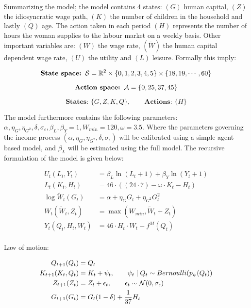 Summarizing the model; the model contains 4 states: $(G)$ human capital, $(Z)$ the idiosyncratic wage path, $(K)$ the number of children in the household and lastly $(Q)$ age. The action taken in each period $(H)$ represents the number of hours the woman supplies to the labour market on a weekly basis. Other important variables are: $(W)$ the wage rate, $(\tilde{W})$ the human capital dependent wage rate,  $(U)$ the utility and $(L)$ leisure. Formally this imply:

\begin{equation}
    \textbf{State space: }\mathcal{S} = \mathbb{R}^{2} \times \{0, 1, 2, 3, 4, 5\} \times \{ 18, 19, \cdots, 60\}
\end{equation}

\begin{equation}
    \textbf{Action space: }\mathcal{A}  = \{0, 25, 37, 45\} 
\end{equation}

\begin{equation}
    \textbf{States: }\{G, Z, K, Q\}, \qquad \textbf{Actions: } \{H\} 
\end{equation}

The model furthermore contains the following parameters: $\alpha, \eta_G, \eta_{G^2}, \delta, \sigma_\epsilon, \beta_L, \beta_Y=1, W_{min}=120, \omega=3.5$. Where the parameters governing the income process $(\alpha, \eta_G, \eta_{G^2}, \delta, \sigma_\epsilon)$ will be calibrated using a simple agent based model, and $\beta_L$ will be estimated using the full model. The recursive formulation of the model is given below:

\begin{align}
    U_t(L_t, Y_t) &= \beta_L \ln(L_t + 1) + \beta_Y \ln(Y_t + 1) \label{eq:utility_v1}\\
    L_t(K_t, H_t) &= 46 \cdot ((24 \cdot 7) - \omega \cdot K_t  - H_t) \label{eq:leissure_v1}\\
    \log \tilde{W}_t (G_t) &= \alpha + \eta_G G_t + \eta_{G^2} G_t^2 \label{eq:salary_tilde_v1}\\
    W_t(\tilde{W}_t, Z_t) &= \max(W_{min} , \tilde{W}_t  + Z_t)  \label{eq:salary_v1}\\
    Y_t(Q_t,H_t, W_t) &= 46 \cdot H_t \cdot W_t + f^M(Q_t) \label{eq:total_salary_v1}\\
\end{align}

Law of motion:

\begin{align}
    Q_{t+1}(Q_t) &= Q_t \label{eq:age_v1}\\
    K_{t+1}(K_t, Q_t)  &= K_{t} + \psi_t, \qquad \psi_t \mid Q_t \sim Bernoulli(p_\psi(Q_t)) \label{eq:fertility_v1} \\
    Z_{t+1}(Z_t) &= Z_t + \epsilon_t, \qquad \epsilon_t \sim \mathcal{N}(0, \sigma_\epsilon) \label{eq:idiosyncratic_wage_path_v1}\\
    G_{t+1}(G_t) &= G_t(1 - \delta) + \frac{1}{37} H_t \\
\end{align}


